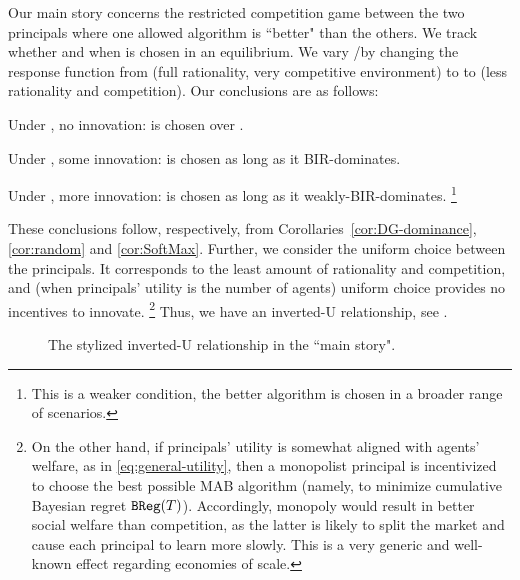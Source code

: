 Our main story concerns the restricted competition game between the two principals where one allowed algorithm \alg is ``better" than the others. {We track whether and when \alg is chosen in an equilibrium.} We vary \competitiveness/\rationality by changing the response function from \HardMax (full rationality, very competitive environment) to \HardMaxRandom to  \SoftMaxRandom (less rationality and competition). Our conclusions are as follows:
\begin{OneLiners}
\item Under \HardMax, no innovation: \DynGreedy is chosen over \alg.
\item Under \HardMaxRandom, some innovation:  \alg is chosen as long as it BIR-dominates.
\item Under \SoftMaxRandom, more innovation: \alg is chosen as long as it weakly-BIR-dominates.%
\footnote{This is a weaker condition, the better algorithm is chosen in a broader range of scenarios.}
\end{OneLiners}
These conclusions follow, respectively, from Corollaries~\ref{cor:DG-dominance}, \ref{cor:random} and \ref{cor:SoftMax}. Further, {we consider the uniform choice between the principals. It corresponds to the least amount of rationality and competition, and (when principals' utility is the number of agents) uniform choice provides no incentives to innovate.}%
\footnote{On the other hand, if principals' utility is somewhat aligned with agents' welfare, as in \eqref{eq:general-utility}, then a monopolist principal is incentivized to choose the best possible MAB algorithm (namely, to minimize cumulative Bayesian regret $\mathtt{BReg}(T)$). Accordingly, monopoly would result in better social welfare than competition, as the latter is likely to split the market and cause each principal to learn more slowly. This is a very generic and well-known effect regarding economies of scale.}
Thus, we have an inverted-U relationship, see .


\begin{figure}
\begin{center}

\caption{The stylized inverted-U relationship in the ``main story".}
\label{fig:inverted-U2}
\end{center}
\end{figure}


